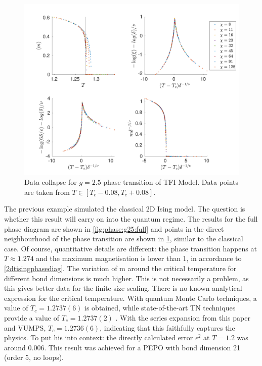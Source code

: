 \begin{figure}[!htbp]
  \center
  \includegraphics[width=\textwidth]{Figuren/phasediag/g25/zoomed.pdf}
  \caption{ Data collapse for $g=2.5$ phase transition of \Gls{TFI} Model. Data points are taken from $T \in \left[ T_c -0.08, T_c +0.08 \right]$. }
  \label{fig:phase:g25:zoomed}
\end{figure}

The previous example simulated the classical 2D Ising model. The question is whether this result will carry on into the quantum regime. The results for the full phase diagram are shown in \cref{fig:phase:g25:full} and points in the direct neighbourhood of the phase transition are shown in \cref{fig:phase:g25:zoomed}, similar to the classical case. Of course, quantitative details are different: the phase transition happens at $T\approx 1.274$ and the maximum magnetisation is lower than 1, in accordance to \cref{2dtisingphasediag}. The variation of m around the critical temperature for different bond dimensions is much higher. This is not necessarily a problem, as this gives better data for the finite-size scaling.
There is no known analytical expression for the critical temperature. With quantum Monte Carlo techniques, a value of $T_c=1.2737(6)$ is obtained, while state-of-the-art \Gls{TN} techniques provide a value of $T_c=1.2737(2)$ \cite{Czarnik2019}. With the series expansion from this paper and \Gls{VUMPS}, $T_c=1.2736(6)$, indicating that this faithfully captures the physics. To put his into context: the directly calculated error $\epsilon^{2}$  at $T=1.2$ was around $0.006$. This result was achieved for a PEPO with bond dimension 21 (order 5, no loops).

